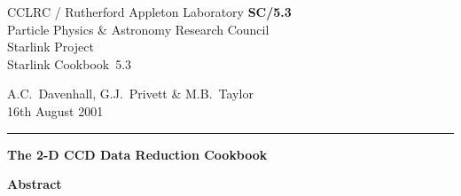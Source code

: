 \documentclass[twoside,11pt]{article}
\newcommand{\stardoccategory}  {Starlink Cookbook}
\newcommand{\stardocinitials}  {SC}
\newcommand{\stardocnumber}    {5.3}
\newcommand{\stardocauthors}   {A.C.~Davenhall, G.J.~Privett \& M.B.~Taylor}
\newcommand{\stardocdate}      {16th August 2001}
\newcommand{\stardoctitle}     {The 2-D CCD Data Reduction Cookbook}
\newcommand{\stardocname}{\stardocinitials /\stardocnumber}
\begin{document}
\thispagestyle{empty}

\begin{latex}
   CCLRC / {\sc Rutherford Appleton Laboratory} \hfill {\bf \stardocname}\\
   {\large Particle Physics \& Astronomy Research Council}\\
   {\large Starlink Project\\}
   {\large \stardoccategory\ \stardocnumber}
   \begin{flushright}
   \stardocauthors\\
   \stardocdate
   \end{flushright}
   \vspace{-4mm}
   \rule{\textwidth}{0.5mm}
   \vspace{5mm}
   \begin{center}
   {\Huge\bf  \stardoctitle \\ [2.5ex]}
   \end{center}
   \vspace{5mm}


   \vspace{10mm}
   \begin{center}
      {\Large\bf Abstract}
   \end{center}
\end{latex}
\end{document}
